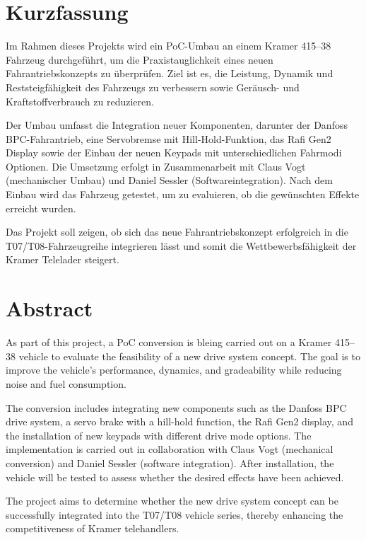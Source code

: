 \documentclass[a4paper, 12pt]{article} %
\begin{document}
\section*{Kurzfassung}
\begin{spacing}{1.8}  %
    \fontsize{14pt}{14pt}\selectfont  %
    Im Rahmen dieses Projekts wird ein \acf{PoC}-Umbau an einem Kramer 415–38 Fahrzeug durchgeführt, 
    um die Praxistauglichkeit eines neuen Fahrantriebskonzepts zu überprüfen. Ziel ist es, die Leistung, 
    Dynamik und Reststeigfähigkeit des Fahrzeugs zu verbessern sowie Geräusch- und Kraftstoffverbrauch zu reduzieren.

    Der Umbau umfasst die Integration neuer Komponenten, darunter der Danfoss \ac{BPC}-Fahrantrieb, 
    eine Servobremse mit Hill-Hold-Funktion, das Rafi Gen2 Display sowie der Einbau der neuen Keypads 
    mit unterschiedlichen Fahrmodi Optionen. Die Umsetzung erfolgt in Zusammenarbeit mit Claus Vogt (mechanischer Umbau) und 
    Daniel Sessler (Softwareintegration). Nach dem Einbau wird das Fahrzeug getestet, um zu evaluieren, ob die gewünschten Effekte erreicht wurden.
    
    Das Projekt soll zeigen, ob sich das neue Fahrantriebskonzept erfolgreich in die T07/T08-Fahrzeugreihe integrieren lässt und somit die Wettbewerbsfähigkeit der Kramer Telelader steigert.
\end{spacing}

\clearpage
\section*{Abstract}
\begin{spacing}{1.8}  %
    \fontsize{14pt}{14pt}\selectfont  %
    As part of this project, a \acf{PoC} conversion is bleing carried out on a Kramer 415–38 
    vehicle to evaluate the feasibility of a new drive system concept. The goal is to 
    improve the vehicle's performance, dynamics, and gradeability while reducing noise and fuel consumption.

    The conversion includes integrating new components such as the Danfoss \ac{BPC} drive system, 
    a servo brake with a hill-hold function, the Rafi Gen2 display, and the installation of new 
    keypads with different drive mode options. The implementation is carried out in collaboration with Claus Vogt 
    (mechanical conversion) and Daniel Sessler (software integration). After installation, the vehicle 
    will be tested to assess whether the desired effects have been achieved.
    
    The project aims to determine whether the new drive system concept can be successfully 
    integrated into the T07/T08 vehicle series, thereby enhancing the competitiveness of Kramer telehandlers.

\end{spacing}
\clearpage
\end{document}
